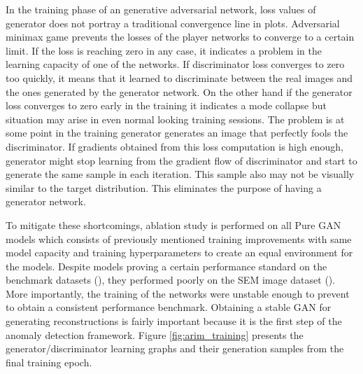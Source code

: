 In the training phase of an generative adversarial network, loss values of generator does not
portray a traditional convergence line in plots. Adversarial minimax game prevents the losses of the
player networks to converge to a certain limit. If the loss is reaching zero in any case, it
indicates a problem in the learning capacity of one of the networks. If discriminator loss converges
to zero too quickly, it means that it learned to discriminate between the real images and the ones
generated by the generator network. On the other hand if the generator loss converges to zero early
in the training  it indicates a mode collapse but situation may arise in even normal looking
training sessions. The problem is at some point in the training generator generates an image that
perfectly fools the discriminator. If gradients obtained from this loss computation is high enough,
generator might stop learning from the gradient flow of discriminator and start to generate the same
sample in each iteration. This sample also may not be visually similar to the target distribution.
This eliminates the purpose of having a generator network.

To mitigate these shortcomings, ablation study is performed on all Pure GAN models which consists of
previously mentioned training improvements with same model capacity and training hyperparameters to
create an equal environment for the models. Despite models proving a certain performance standard on
the benchmark datasets (\cite{cifar10,Netzer2011ReadingDI}), they performed poorly on the SEM image
dataset (\cite{sem}). More importantly, the training of the networks were unstable enough to prevent
to obtain a consistent performance benchmark. Obtaining a stable GAN for generating reconstructions
is fairly important because it is the first step of the anomaly detection framework. Figure
\ref{fig:arim_training} presents the generator/discriminator learning graphs and their generation
samples from the final training epoch.

